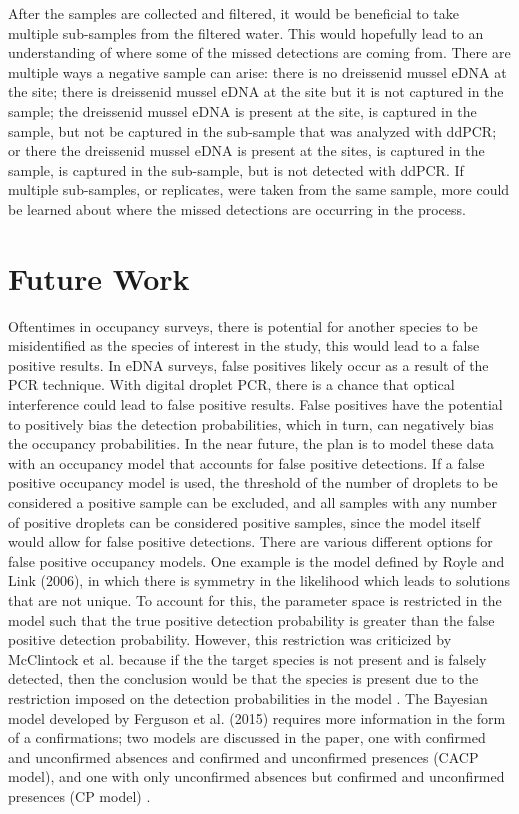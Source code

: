 \documentclass[12pt]{article}\usepackage[]{graphicx}\usepackage[]{color}
\begin{document}
After the samples are collected and filtered, it would be beneficial to take multiple sub-samples from the filtered water. This would hopefully lead to an understanding of where some of the missed detections are coming from. There are multiple ways a negative sample can arise: there is no dreissenid mussel eDNA at the site; there is dreissenid mussel eDNA at the site but it is not captured in the sample; the dreissenid mussel eDNA is present at the site, is captured in the sample, but not be captured in the sub-sample that was analyzed with ddPCR; or there the dreissenid mussel eDNA is present at the sites, is captured in the sample, is captured in the sub-sample, but is not detected with ddPCR. If multiple sub-samples, or replicates, were taken from the same sample, more could be learned about where the missed detections are occurring in the process.

\section{Future Work}

Oftentimes in occupancy surveys, there is potential for another species to be misidentified as the species of interest in the study, this would lead to a false positive results. In eDNA surveys, false positives likely occur as a result of the PCR technique. With digital droplet PCR, there is a chance that optical interference could lead to false positive results. False positives have the potential to positively bias the detection probabilities, which in turn, can negatively bias the occupancy probabilities. In the near future, the plan is to model these data with an occupancy model that accounts for false positive detections. If a false positive occupancy model is used, the threshold of the number of droplets to be considered a positive sample can be excluded, and all samples with any number of positive droplets can be considered positive samples, since the model itself would allow for false positive detections. There are various different options for false positive occupancy models. One example is the model defined by Royle and Link (2006), in which there is symmetry in the likelihood which leads to solutions that are not unique. To account for this, the parameter space is restricted in the model such that the true positive detection probability is greater than the false positive detection probability. However, this restriction was criticized by McClintock et al. because if the the target species is not present and is falsely detected, then the conclusion would be that the species is present due to the restriction imposed on the detection probabilities in the model \cite{McClintock}. The Bayesian model developed by Ferguson et al. (2015) requires more information in the form of a confirmations; two models are discussed in the paper, one with confirmed and unconfirmed absences and confirmed and unconfirmed presences (CACP model), and one with only unconfirmed absences but confirmed and unconfirmed presences (CP model) \cite{Ferguson}.
\end{document}

